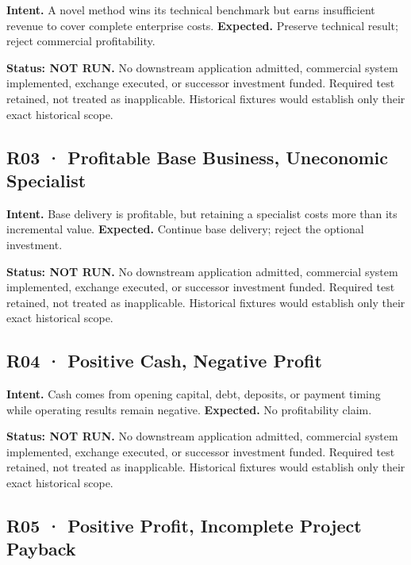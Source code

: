 \documentclass[10pt,letterpaper]{article}
\begin{document}
\textbf{Intent.} A novel method wins its technical benchmark but earns
insufficient revenue to cover complete enterprise costs.
\textbf{Expected.} Preserve technical result; reject commercial
profitability.

\textbf{Status: NOT RUN.} No downstream application admitted, commercial
system implemented, exchange executed, or successor investment funded.
Required test retained, not treated as inapplicable. Historical fixtures
would establish only their exact historical scope.

\hypertarget{r03-profitable-base-business-uneconomic-specialist}{%
\subsection{R03 · Profitable Base Business, Uneconomic
Specialist}\label{r03-profitable-base-business-uneconomic-specialist}}

\textbf{Intent.} Base delivery is profitable, but retaining a specialist
costs more than its incremental value. \textbf{Expected.} Continue base
delivery; reject the optional investment.

\textbf{Status: NOT RUN.} No downstream application admitted, commercial
system implemented, exchange executed, or successor investment funded.
Required test retained, not treated as inapplicable. Historical fixtures
would establish only their exact historical scope.

\hypertarget{r04-positive-cash-negative-profit}{%
\subsection{R04 · Positive Cash, Negative
Profit}\label{r04-positive-cash-negative-profit}}

\textbf{Intent.} Cash comes from opening capital, debt, deposits, or
payment timing while operating results remain negative.
\textbf{Expected.} No profitability claim.

\textbf{Status: NOT RUN.} No downstream application admitted, commercial
system implemented, exchange executed, or successor investment funded.
Required test retained, not treated as inapplicable. Historical fixtures
would establish only their exact historical scope.

\hypertarget{r05-positive-profit-incomplete-project-payback}{%
\subsection{R05 · Positive Profit, Incomplete Project
Payback}\label{r05-positive-profit-incomplete-project-payback}}
\end{document}
